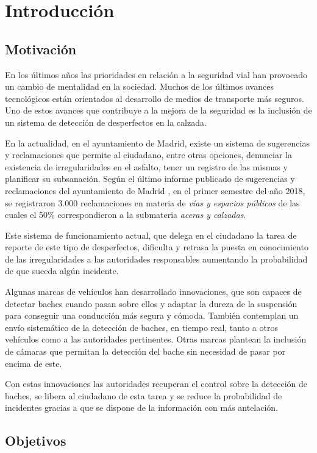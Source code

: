 \section{Introducción}

\subsection{Motivación}

En los últimos años las prioridades en relación a la seguridad vial han provocado un cambio de mentalidad en la sociedad.  Muchos de los últimos avances tecnológicos están orientados al desarrollo de medios de transporte más seguros. Uno de estos avances que contribuye a la mejora de la seguridad es la inclusión de un sistema de detección de desperfectos en la calzada.

En la actualidad, en el ayuntamiento de Madrid, existe un sistema de sugerencias y reclamaciones \cite{s1_syr} que permite al ciudadano, entre otras opciones, denunciar la existencia de irregularidades en el asfalto, tener un registro de las mismas y planificar su subsanación. Según el último informe publicado de sugerencias y reclamaciones del ayuntamiento de Madrid \cite{s1_syrreport}, en el primer semestre del año 2018, se registraron 3.000 reclamaciones en materia de \textit{vías y espacios públicos} de las cuales el 50\% correspondieron a la submateria \textit{aceras y calzadas}.

Este sistema de funcionamiento actual, que delega en el ciudadano la tarea de reporte de este tipo de desperfectos, dificulta y retrasa la puesta en conocimiento de las irregularidades a las autoridades responsables aumentando la probabilidad de que suceda algún incidente.

Algunas marcas de vehículos han desarrollado innovaciones, que son capaces de detectar baches cuando pasan sobre ellos y adaptar la dureza de la suspensión para conseguir una conducción más segura y cómoda. También contemplan un envío sistemático de la detección de baches, en tiempo real, tanto a otros vehículos como a las autoridades pertinentes. Otras marcas plantean la inclusión de cámaras que permitan la detección del bache sin necesidad de pasar por encima de este.

Con estas innovaciones las autoridades recuperan el control sobre la detección de baches, se libera al ciudadano de esta tarea y se reduce la probabilidad de incidentes gracias a que se dispone de la información con más antelación.

\subsection{Objetivos}

